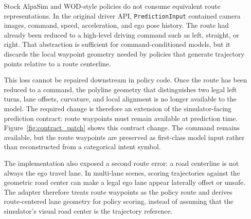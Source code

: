 \documentclass{article}
\begin{document}
Stock AlpaSim and WOD-style policies do not consume equivalent route representations. In
the original driver API, \texttt{PredictionInput} contained camera images, command,
speed, acceleration, and ego pose history. The route had already been reduced to a
high-level driving command such as left, straight, or right. That abstraction is
sufficient for command-conditioned models, but it discards the local waypoint geometry
needed by policies that generate trajectory points relative to a route centerline.

This loss cannot be repaired downstream in policy code. Once the route
has been reduced to a command, the polyline geometry that distinguishes two legal left
turns, lane offsets, curvature, and local alignment is no longer available to the model.
The required change is therefore an extension of the simulator-facing prediction
contract: route waypoints must remain available at prediction time.
Figure~\ref{fig:contract_patch} shows this contract change. The command remains available, but
the route waypoints are preserved as first-class model input rather than reconstructed
from a categorical intent symbol.

The implementation also exposed a second route error: a road centerline is not always
the ego travel lane. In multi-lane scenes, scoring trajectories against the geometric
road center can make a legal ego lane appear laterally offset or unsafe. The adapter
therefore treats route waypoints as the policy route and derives route-centered lane
geometry for policy scoring, instead of assuming that the simulator's visual road center
is the trajectory reference.
\end{document}
